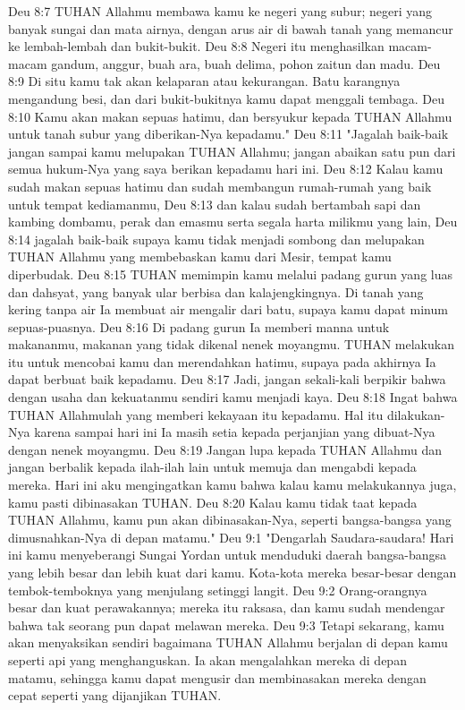 Deu 8:7  TUHAN Allahmu membawa kamu ke negeri yang subur; negeri yang banyak sungai dan mata airnya, dengan arus air di bawah tanah yang memancur ke lembah-lembah dan bukit-bukit.
Deu 8:8  Negeri itu menghasilkan macam-macam gandum, anggur, buah ara, buah delima, pohon zaitun dan madu.
Deu 8:9  Di situ kamu tak akan kelaparan atau kekurangan. Batu karangnya mengandung besi, dan dari bukit-bukitnya kamu dapat menggali tembaga.
Deu 8:10  Kamu akan makan sepuas hatimu, dan bersyukur kepada TUHAN Allahmu untuk tanah subur yang diberikan-Nya kepadamu."
Deu 8:11  "Jagalah baik-baik jangan sampai kamu melupakan TUHAN Allahmu; jangan abaikan satu pun dari semua hukum-Nya yang saya berikan kepadamu hari ini.
Deu 8:12  Kalau kamu sudah makan sepuas hatimu dan sudah membangun rumah-rumah yang baik untuk tempat kediamanmu,
Deu 8:13  dan kalau sudah bertambah sapi dan kambing dombamu, perak dan emasmu serta segala harta milikmu yang lain,
Deu 8:14  jagalah baik-baik supaya kamu tidak menjadi sombong dan melupakan TUHAN Allahmu yang membebaskan kamu dari Mesir, tempat kamu diperbudak.
Deu 8:15  TUHAN memimpin kamu melalui padang gurun yang luas dan dahsyat, yang banyak ular berbisa dan kalajengkingnya. Di tanah yang kering tanpa air Ia membuat air mengalir dari batu, supaya kamu dapat minum sepuas-puasnya.
Deu 8:16  Di padang gurun Ia memberi manna untuk makananmu, makanan yang tidak dikenal nenek moyangmu. TUHAN melakukan itu untuk mencobai kamu dan merendahkan hatimu, supaya pada akhirnya Ia dapat berbuat baik kepadamu.
Deu 8:17  Jadi, jangan sekali-kali berpikir bahwa dengan usaha dan kekuatanmu sendiri kamu menjadi kaya.
Deu 8:18  Ingat bahwa TUHAN Allahmulah yang memberi kekayaan itu kepadamu. Hal itu dilakukan-Nya karena sampai hari ini Ia masih setia kepada perjanjian yang dibuat-Nya dengan nenek moyangmu.
Deu 8:19  Jangan lupa kepada TUHAN Allahmu dan jangan berbalik kepada ilah-ilah lain untuk memuja dan mengabdi kepada mereka. Hari ini aku mengingatkan kamu bahwa kalau kamu melakukannya juga, kamu pasti dibinasakan TUHAN.
Deu 8:20  Kalau kamu tidak taat kepada TUHAN Allahmu, kamu pun akan dibinasakan-Nya, seperti bangsa-bangsa yang dimusnahkan-Nya di depan matamu."
Deu 9:1  "Dengarlah Saudara-saudara! Hari ini kamu menyeberangi Sungai Yordan untuk menduduki daerah bangsa-bangsa yang lebih besar dan lebih kuat dari kamu. Kota-kota mereka besar-besar dengan tembok-temboknya yang menjulang setinggi langit.
Deu 9:2  Orang-orangnya besar dan kuat perawakannya; mereka itu raksasa, dan kamu sudah mendengar bahwa tak seorang pun dapat melawan mereka.
Deu 9:3  Tetapi sekarang, kamu akan menyaksikan sendiri bagaimana TUHAN Allahmu berjalan di depan kamu seperti api yang menghanguskan. Ia akan mengalahkan mereka di depan matamu, sehingga kamu dapat mengusir dan membinasakan mereka dengan cepat seperti yang dijanjikan TUHAN.
